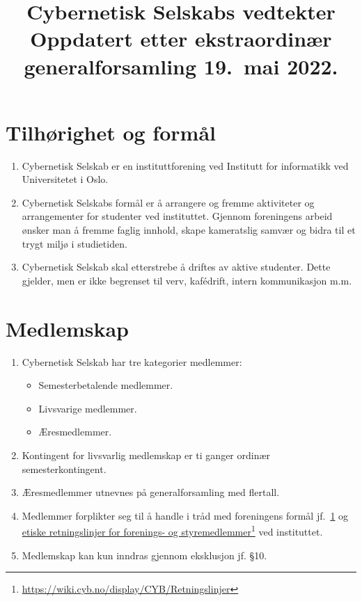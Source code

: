 \documentclass[8pt,norsk,a4paper]{article}
\title{\textbf{Cybernetisk Selskabs vedtekter} \\
	{\large Oppdatert etter ekstraordinær generalforsamling 19.~mai 2022.}}
\date{}
\author{}
\newcommand\fhref[2]{%
	\href{#1}{#2}\footnote{\url{#1}}%
}
\begin{document}
\maketitle{}

\section{Tilhørighet og formål}\label{sec:formaal}
\begin{enumerate}
	\item{Cybernetisk Selskab er en instituttforening ved Institutt for informatikk ved Universitetet i Oslo.}
	\item{Cybernetisk Selskabs formål er å arrangere og fremme aktiviteter og arrangementer for studenter ved instituttet. Gjennom foreningens arbeid ønsker man å fremme faglig innhold, skape kameratslig samvær og bidra til et trygt miljø i studietiden.}
	\item{Cybernetisk Selskab skal etterstrebe å driftes av aktive studenter. Dette gjelder, men er ikke begrenset til verv, kafédrift, intern kommunikasjon m.m.}
\end{enumerate}

\section{Medlemskap}\label{sec:medlemskap}
\begin{enumerate}
	\item{Cybernetisk Selskab har tre kategorier medlemmer:}
	\begin{itemize}
		\item{Semesterbetalende medlemmer.}
		\item{Livsvarige medlemmer.}
		\item{Æresmedlemmer.}
	\end{itemize}
	\item{Kontingent for livsvarlig medlemskap er ti ganger ordinær semesterkontingent.}
	\item{Æresmedlemmer utnevnes på generalforsamling med  flertall.}
	\item Medlemmer forplikter seg til å handle i tråd med foreningens formål jf.~\ref{sec:formaal} og \fhref{https://wiki.cyb.no/display/CYB/Retningslinjer}{etiske retningslinjer for forenings- og styremedlemmer} ved instituttet\footnotemark.\label{item:forpliktelser}
	\item Medlemskap kan kun inndras gjennom eksklusjon jf. §10.
\end{enumerate}
\end{document}
